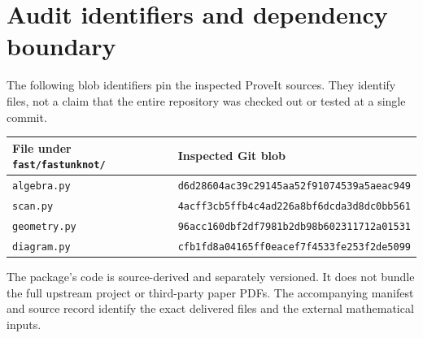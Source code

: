 \documentclass[11pt]{article}
\theoremstyle{definition}\newtheorem{definition}[theorem]{Definition}
\theoremstyle{remark}\newtheorem{remark}[theorem]{Remark}
\begin{document}
\section{Audit identifiers and dependency boundary}
The following blob identifiers pin the inspected ProveIt sources. They identify files, not a claim that the entire repository was checked out or tested at a single commit.
\begin{center}\small
\begin{tabular}{lp{99mm}}\toprule
File under \texttt{fast/fastunknot/} & Inspected Git blob\\\midrule
\texttt{algebra.py} & \texttt{d6d28604ac39c29145aa52f91074539a5aeac949}\\
\texttt{scan.py} & \texttt{4acff3cb5ffb4c4ad226a8bf6dcda3d8dc0bb561}\\
\texttt{geometry.py} & \texttt{96acc160dbf2df7981b2db98b602311712a01531}\\
\texttt{diagram.py} & \texttt{cfb1fd8a04165ff0eacef7f4533fe253f2de5099}\\
\bottomrule\end{tabular}
\end{center}
The package's code is source-derived and separately versioned. It does not bundle the full upstream project or third-party paper PDFs. The accompanying manifest and source record identify the exact delivered files and the external mathematical inputs.
\end{document}
